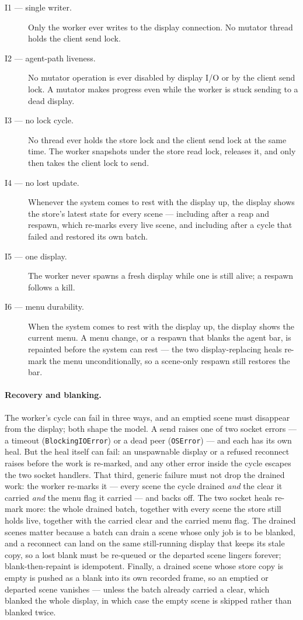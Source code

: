 \documentclass[a4paper,10pt,fleqn]{article}
\begin{document}
\begin{description}
  \item[I1 --- single writer.] Only the worker ever writes to the display
    connection.  No mutator thread holds the client send lock.
  \item[I2 --- agent-path liveness.] No mutator operation is ever disabled
    by display I/O or by the client send lock.  A mutator makes progress
    even while the worker is stuck sending to a dead display.
  \item[I3 --- no lock cycle.] No thread ever holds the store lock and the
    client send lock at the same time.  The worker snapshots under the
    store read lock, releases it, and only then takes the client lock to
    send.
  \item[I4 --- no lost update.] Whenever the system comes to rest with the
    display up, the display shows the store's latest state for every scene
    --- including after a reap and respawn, which re-marks every live
    scene, and including after a cycle that failed and restored its own
    batch.
  \item[I5 --- one display.] The worker never spawns a fresh display while
    one is still alive; a respawn follows a kill.
  \item[I6 --- menu durability.] When the system comes to rest with the
    display up, the display shows the current menu.  A menu change, or a
    respawn that blanks the agent bar, is repainted before the system can
    rest --- the two display-replacing heals re-mark the menu
    unconditionally, so a scene-only respawn still restores the bar.
\end{description}

\paragraph{Recovery and blanking.}
The worker's cycle can fail in three ways, and an emptied scene must
disappear from the display; both shape the model.  A send raises one of two
socket errors --- a timeout (\texttt{BlockingIOError}) or a dead peer
(\texttt{OSError}) --- and each has its own heal.  But the heal itself can
fail: an unspawnable display or a refused reconnect raises before the work is
re-marked, and any other error inside the cycle escapes the two socket
handlers.  That third, generic failure must not drop the drained work: the
worker re-marks it --- every scene the cycle drained \emph{and} the clear it
carried \emph{and} the menu flag it carried --- and backs off.  The two socket
heals re-mark more: the whole drained batch, together with every scene the
store still holds live, together with the carried clear and the carried menu
flag.  The drained scenes matter because a batch can drain a scene whose only
job is to be blanked, and a reconnect can land on the same still-running
display that keeps its stale copy, so a lost blank must be re-queued or the
departed scene lingers forever; blank-then-repaint is idempotent.  Finally, a
drained scene whose store copy is empty is pushed as a blank into its own
recorded frame, so an emptied or departed scene vanishes --- unless the batch
already carried a clear, which blanked the whole display, in which case the
empty scene is skipped rather than blanked twice.
\end{document}
